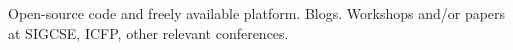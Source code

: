Open-source code and freely available platform.  Blogs.  Workshops
and/or papers at SIGCSE, ICFP, other relevant conferences.
